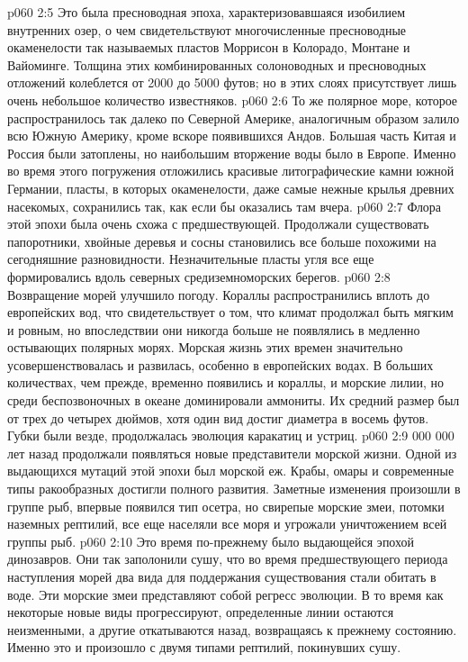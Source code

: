 \vs p060 2:5 Это была пресноводная эпоха, характеризовавшаяся изобилием внутренних озер, о чем свидетельствуют многочисленные пресноводные окаменелости так называемых пластов Моррисон в Колорадо, Монтане и Вайоминге. Толщина этих комбинированных солоноводных и пресноводных отложений колеблется от 2000 до 5000 футов; но в этих слоях присутствует лишь очень небольшое количество известняков.
\vs p060 2:6 То же полярное море, которое распространилось так далеко по Северной Америке, аналогичным образом залило всю Южную Америку, кроме вскоре появившихся Андов. Большая часть Китая и Россия были затоплены, но наибольшим вторжение воды было в Европе. Именно во время этого погружения отложились красивые литографические камни южной Германии, пласты, в которых окаменелости, даже самые нежные крылья древних насекомых, сохранились так, как если бы оказались там вчера.
\vs p060 2:7 Флора этой эпохи была очень схожа с предшествующей. Продолжали существовать папоротники, хвойные деревья и сосны становились все больше похожими на сегодняшние разновидности. Незначительные пласты угля все еще формировались вдоль северных средиземноморских берегов.
\vs p060 2:8 Возвращение морей улучшило погоду. Кораллы распространились вплоть до европейских вод, что свидетельствует о том, что климат продолжал быть мягким и ровным, но впоследствии они никогда больше не появлялись в медленно остывающих полярных морях. Морская жизнь этих времен значительно усовершенствовалась и развилась, особенно в европейских водах. В больших количествах, чем прежде, временно появились и кораллы, и морские лилии, но среди беспозвоночных в океане доминировали аммониты. Их средний размер был от трех до четырех дюймов, хотя один вид достиг диаметра в восемь футов. Губки были везде, продолжалась эволюция каракатиц и устриц.
\vs p060 2:9  000 000 лет назад продолжали появляться новые представители морской жизни. Одной из выдающихся мутаций этой эпохи был морской еж. Крабы, омары и современные типы ракообразных достигли полного развития. Заметные изменения произошли в группе рыб, впервые появился тип осетра, но свирепые морские змеи, потомки наземных рептилий, все еще населяли все моря и угрожали уничтожением всей группы рыб.
\vs p060 2:10 Это время по\hyp{}прежнему было выдающейся эпохой динозавров. Они так заполонили сушу, что во время предшествующего периода наступления морей два вида для поддержания существования стали обитать в воде. Эти морские змеи представляют собой регресс эволюции. В то время как некоторые новые виды прогрессируют, определенные линии остаются неизменными, а другие откатываются назад, возвращаясь к прежнему состоянию. Именно это и произошло с двумя типами рептилий, покинувших сушу.
